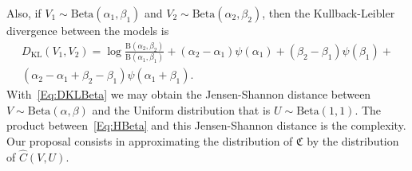 \documentclass[12pt]{article}
\begin{document}
Also, if $V_1\sim\text{Beta}(\alpha_1,\beta_1)$ and
$V_2\sim\text{Beta}(\alpha_2,\beta_2)$, then the Kullback-Leibler divergence between the models is
\begin{multline}
D_{\text{KL}}(V_1,V_2) = \log\frac{\text{B}(\alpha_2,\beta_2)}{\text{B}(\alpha_1,\beta_1)} +
(\alpha_2-\alpha_1) \psi(\alpha_1) +
(\beta_2-\beta_1) \psi(\beta_1) + \\
(\alpha_2-\alpha_1+\beta_2-\beta_1) \psi(\alpha_1+\beta_1).
\label{Eq:DKLBeta}
\end{multline}
With~\eqref{Eq:DKLBeta} we may obtain the Jensen-Shannon distance between $V\sim\text{Beta}(\alpha,\beta)$ and the Uniform distribution that is $U\sim\text{Beta}(1,1)$.
The product between~\eqref{Eq:HBeta} and this Jensen-Shannon distance is the complexity.
Our proposal consists in approximating the distribution of $\mathfrak{C}$ by the distribution of $\widehat{C}(V,U)$.
\end{document}
